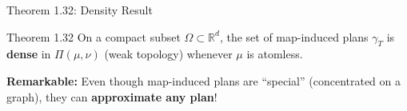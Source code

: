 \documentclass[aspectratio=169]{beamer}
\newcommand{\R}{\mathbb{R}}
\begin{document}
\begin{frame}{Theorem 1.32: Density Result}
\begin{block}{Theorem 1.32}
On a compact subset $\Omega \subset \R^d$, the set of map-induced plans $\gamma_T$ is \textbf{dense} in $\Pi(\mu, \nu)$ (weak topology) whenever $\mu$ is atomless.
\end{block}

\vspace{0.2cm}
\textbf{Remarkable:} Even though map-induced plans are ``special'' (concentrated on a graph), they can \textbf{approximate any plan}!

\begin{center}
\end{center}
\end{frame}
\end{document}
